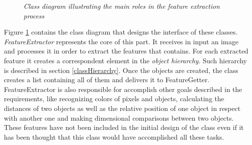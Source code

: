 	\begin{figure}[h]
	  \begin{center} 
	  \end{center} 
	  \caption{\textit{Class diagram illustrating the main roles in the feature extraction process}}  
	  \label{fig:FeatureDesign}
 	\end{figure}
	
	Figure \ref{fig:FeatureDesign} contains the class diagram that designs the interface of these classes.
	\emph{FeatureExtractor} represents the core of this part. It receives in input an image and processes it in order to extract the features that contains. For each extracted feature it creates a correspondent element in the \emph{object hierarchy}. Such hierarchy is described in section \ref{classHierarchy}. Once the objects are created, the class creates a list containing all of them and delivers it to FeatureGetter. 
	FeatureExtractor is also responsible for accomplish other goals described in the requirements, like recognizing colors of pixels and objects, calculating the distances of two objects as well as the relative position of one object in respect with another one and making dimensional comparisons between two objects. These features have not been included in the initial design of the class even if it has been thought that this class would have accomplished all these tasks.

